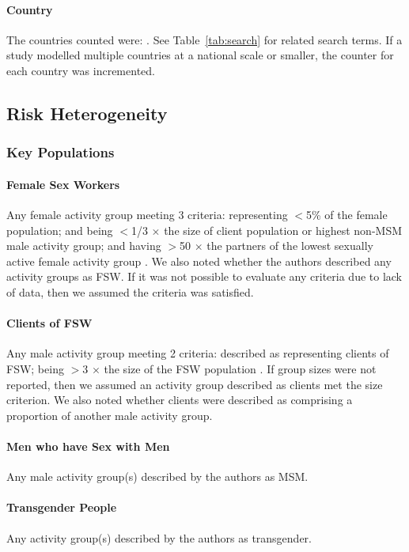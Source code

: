 \paragraph{Country}
The countries counted were: \emph{\countrylist}.
See Table~\ref{tab:search} for related search terms.
If a study modelled multiple countries at a national scale or smaller,
the counter for each country was incremented.
\subsection{Risk Heterogeneity}
\label{aa:defs:risk}
\subsubsection{Key Populations}
\label{aaa:defs:kp}
\paragraph{Female Sex Workers}
Any female activity group meeting 3 criteria:
representing {$<$5\%} of the female population; and
being {$<$1/3 $\times$} the size of client population or highest non-MSM male activity group; and
having {$>$50 $\times$} the partners of the lowest sexually active female activity group
\cite{Vandepitte2006,Carael2006,Scorgie2012}.
We also noted whether the authors described any activity groups as FSW.
If it was not possible to evaluate any criteria due to lack of data,
then we assumed the criteria was satisfied.
\paragraph{Clients of FSW}
Any male activity group meeting 2 criteria:
described as representing clients of FSW;
being {$>$3 $\times$} the size of the FSW population \cite{Carael2006}.
If group sizes were not reported,
then we assumed an activity group described as clients met the size criterion.
We also noted whether clients were described as
comprising a proportion of another male activity group.
\paragraph{Men who have Sex with Men}
Any male activity group(s) described by the authors as MSM.
\paragraph{Transgender People}
Any activity group(s) described by the authors as transgender.
